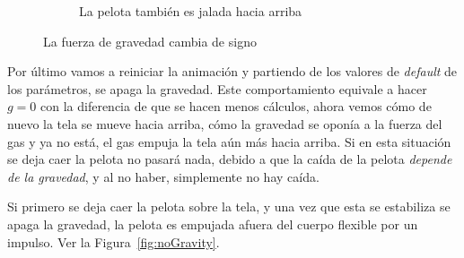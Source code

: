 \begin{figure}
\begin{subfigure}[b]{0.45\textwidth}
    \caption{La pelota también es jalada hacia arriba}
    \label{fig:testGpos2}
  \end{subfigure}
 \caption[Experimento: $g > 0$]{La fuerza de gravedad cambia de signo} 
 \label{fig:positiveGravity}
\end{figure}

Por último vamos a reiniciar la animación y partiendo de los valores de \emph{\foreignlanguage{english}{default}} de los parámetros, se apaga la gravedad. 
Este comportamiento equivale a hacer $g=0$ con la diferencia de que se hacen menos cálculos, ahora vemos cómo de nuevo la tela se mueve hacia arriba, cómo la gravedad se oponía a la fuerza del gas y ya no está, el gas empuja la tela aún más hacia arriba.
Si en esta situación se deja caer la pelota no pasará nada, debido a que la caída de la pelota \emph{depende de la gravedad}, y al no haber, simplemente no hay caída.

Si primero se deja caer la pelota sobre la tela, y una vez que esta se estabiliza se apaga la gravedad, la pelota es empujada afuera del cuerpo flexible por un impulso. Ver la Figura~\ref{fig:noGravity}.

